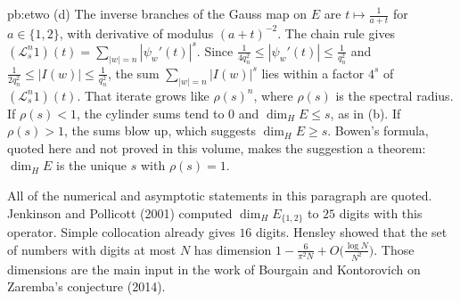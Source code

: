 \begin{solution}{pb:etwo}
(d) The inverse branches of the Gauss map on $E$ are $t\mapsto\frac1{a+t}$ for $a\in\{1,2\}$, with derivative of modulus $(a+t)^{-2}$. The chain rule gives $(\mathcal L_s^n 1)(t)=\sum_{|w|=n}|\psi_w'(t)|^s$. Since $\frac1{4q_n^2}\le|\psi_w'(t)|\le\frac1{q_n^2}$ and $\frac1{2q_n^2}\le|I(w)|\le\frac1{q_n^2}$, the sum $\sum_{|w|=n}|I(w)|^s$ lies within a factor $4^s$ of $(\mathcal L_s^n 1)(t)$. That iterate grows like $\rho(s)^n$, where $\rho(s)$ is the spectral radius. If $\rho(s)<1$, the cylinder sums tend to $0$ and $\dim_HE\le s$, as in (b). If $\rho(s)>1$, the sums blow up, which suggests $\dim_HE\ge s$. Bowen's formula, quoted here and not proved in this volume, makes the suggestion a theorem: $\dim_HE$ is the unique $s$ with $\rho(s)=1$.

\leads All of the numerical and asymptotic statements in this paragraph are quoted. Jenkinson and Pollicott (2001) computed $\dim_HE_{\{1,2\}}$ to $25$ digits with this operator. Simple collocation already gives $16$ digits. Hensley showed that the set of numbers with digits at most $N$ has dimension $1-\frac6{\pi^2 N}+O\bigl(\frac{\log N}{N^2}\bigr)$. Those dimensions are the main input in the work of Bourgain and Kontorovich on Zaremba's conjecture (2014).
\end{solution}

